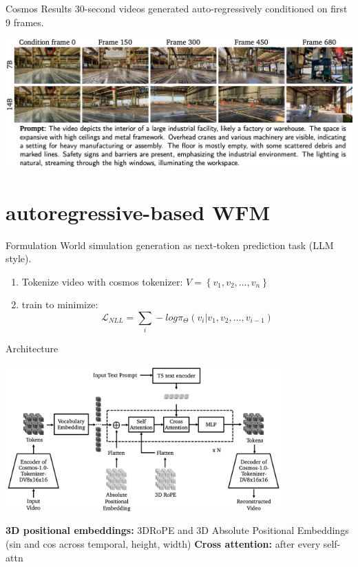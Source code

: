 \documentclass{beamer}
\begin{document}
\begin{frame}{Cosmos Results}
    30-second videos generated auto-regressively conditioned on first 9 frames. 
	\begin{center}
            \includegraphics[width=1.0\textwidth]{./img/diff_arch_result.png}
	\end{center}
\end{frame}

\section{autoregressive-based WFM}
\begin{frame}{Formulation}
    World simulation generation as next-token prediction task (LLM style).\newline
    \vspace{-1em}
    \begin{enumerate}[label=\arabic*.]
        \item Tokenize video with cosmos tokenizer: $V = \left\{v_1, v_2, \dots, v_n \right\}$
        \item train to minimize: \[\mathcal{L}_{NLL} = \sum_i -log \pi_\Theta(v_i | v_1, v_2, \dots, v_{i-1})\]
    \end{enumerate}
\end{frame}

\begin{frame}{Architecture}
	\begin{center}
            \includegraphics[width=0.8\textwidth]{./img/auto_arch.png}
	\end{center}
    \textbf{3D positional embeddings:} 3DRoPE and 3D Absolute Positional Embeddings 
    (sin and cos across temporal, height, width)\newline
    \textbf{Cross attention:} after every self-attn \newline

\end{frame}
\end{document}
